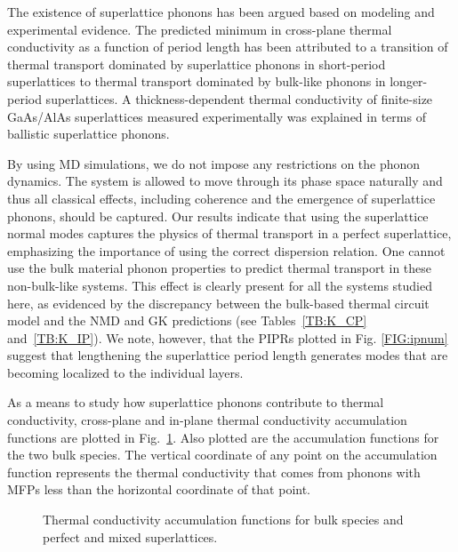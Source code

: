 \documentclass[aps,prb,preprint,preprintnumbers,amsmath,amssymb,floatfix,superscriptaddress]{revtex4}
\begin{document}
The existence of superlattice phonons has been argued based on modeling and experimental evidence. The predicted minimum in cross-plane thermal conductivity as a function of period length\cite{PhysRevB.77.184302,PhysRevB.67.195311,PhysRevB.72.174302,PhysRevB.61.3091} has been attributed to a transition of thermal transport dominated by superlattice phonons in short-period superlattices to thermal transport dominated by bulk-like phonons in longer-period superlattices.\cite{PhysRevLett.84.927,PhysRevB.56.10754} A thickness-dependent thermal conductivity of finite-size GaAs/AlAs superlattices measured experimentally was explained in terms of ballistic superlattice phonons.\cite{Luckyanova16112012} 

By using MD simulations, we do not impose any restrictions on the phonon dynamics. The system is allowed to move through its phase space naturally and thus all classical effects, including coherence and the emergence of superlattice phonons, should be captured. Our results indicate that using the superlattice normal modes captures the physics of thermal transport in a perfect superlattice, emphasizing the importance of using the correct dispersion relation. One cannot use the bulk material phonon properties to predict thermal transport in these non-bulk-like systems. This effect is clearly present for all the systems studied here, as evidenced by the discrepancy between the bulk-based thermal circuit model and the NMD and GK predictions (see Tables~\ref{TB:K_CP} and~\ref{TB:K_IP}). We note, however, that the PIPRs plotted in Fig. \ref{FIG:ipnum} suggest that lengthening the superlattice period length generates modes that are becoming localized to the individual layers.

As a means to study how superlattice phonons contribute to thermal conductivity, cross-plane and in-plane thermal conductivity accumulation functions are plotted in Fig.~\ref{FIG:MFP_cuml}. Also plotted are the accumulation functions for the two bulk species. The vertical coordinate of any point on the accumulation function represents the thermal conductivity that comes from phonons with MFPs less than the horizontal coordinate of that point.

\begin{figure}%
\begin{center}
\renewcommand{\figure}{Fig.}
\caption{Thermal conductivity accumulation functions for bulk species and perfect and mixed superlattices.}
\label{FIG:MFP_cuml}
\end{center}
\end{figure}
\end{document}
